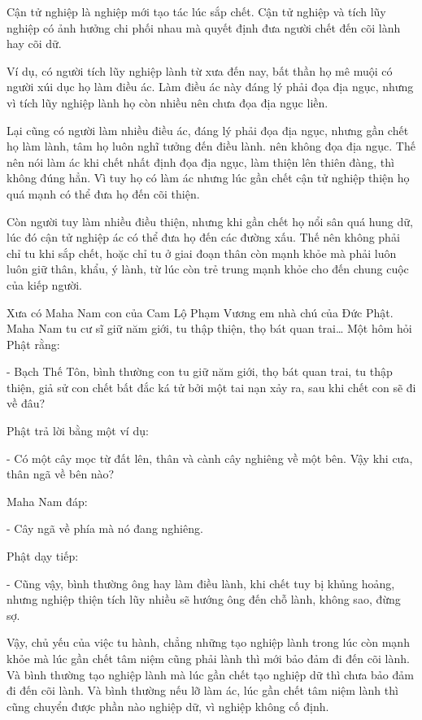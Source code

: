 \documentclass[
  12pt,
  oneside]{book}
\begin{document}
Cận tử nghiệp là nghiệp mới tạo tác lúc sắp chết. Cận tử nghiệp và tích lũy nghiệp có ảnh hưởng chi phối nhau mà quyết định đưa người chết đến cõi lành hay cõi dữ.

Ví dụ, có người tích lũy nghiệp lành từ xưa đến nay, bất thần họ mê muội có người xúi dục họ làm điều ác. Làm điều ác này đáng lý phải đọa địa ngục, nhưng vì tích lũy nghiệp lành họ còn nhiều nên chưa đọa địa ngục liền.

Lại cũng có người làm nhiều điều ác, đáng lý phải đọa địa ngục, nhưng gần chết họ làm lành, tâm họ luôn nghĩ tưởng đến điều lành. nên không đọa địa ngục. Thế nên nói làm ác khi chết nhất định đọa địa ngục, làm thiện lên thiên đàng, thì không đúng hẳn. Vì tuy họ có làm ác nhưng lúc gần chết cận tử nghiệp thiện họ quá mạnh có thể đưa họ đến cõi thiện.

Còn người tuy làm nhiều điều thiện, nhưng khi gần chết họ nổi sân quá hung dữ, lúc đó cận tử nghiệp ác có thể đưa họ đến các đường xấu. Thế nên không phải chỉ tu khi sắp chết, hoặc chỉ tu ở giai đoạn thân còn mạnh khỏe mà phải luôn luôn giữ thân, khẩu, ý lành, từ lúc còn trẻ trung mạnh khỏe cho đến chung cuộc của kiếp người.

Xưa có Maha Nam con của Cam Lộ Phạm Vương em nhà chú của Đức Phật. Maha Nam tu cư sĩ giữ năm giới, tu thập thiện, thọ bát quan trai\ldots{} Một hôm hỏi Phật rằng:

- Bạch Thế Tôn, bình thường con tu giữ năm giới, thọ bát quan trai, tu thập thiện, giả sử con chết bất đắc ká tử bởi một tai nạn xảy ra, sau khi chết con sẽ đi về đâu?

Phật trả lời bằng một ví dụ:

- Có một cây mọc từ đất lên, thân và cành cây nghiêng về một bên. Vậy khi cưa, thân ngã về bên nào?

Maha Nam đáp:

- Cây ngã về phía mà nó đang nghiêng.

Phật dạy tiếp:

- Cũng vậy, bình thường ông hay làm điều lành, khi chết tuy bị khủng hoảng, nhưng nghiệp thiện tích lũy nhiều sẽ hướng ông đến chỗ lành, không sao, đừng sợ.

Vậy, chủ yếu của việc tu hành, chẳng những tạo nghiệp lành trong lúc còn mạnh khỏe mà lúc gần chết tâm niệm cũng phải lành thì mới bảo đảm đi đến cõi lành. Và bình thường tạo nghiệp lành mà lúc gần chết tạo nghiệp dữ thì chưa bảo đảm đi đến cõi lành. Và bình thường nếu lỡ làm ác, lúc gần chết tâm niệm lành thì cũng chuyển được phần nào nghiệp dữ, vì nghiệp không cố định.
\end{document}
